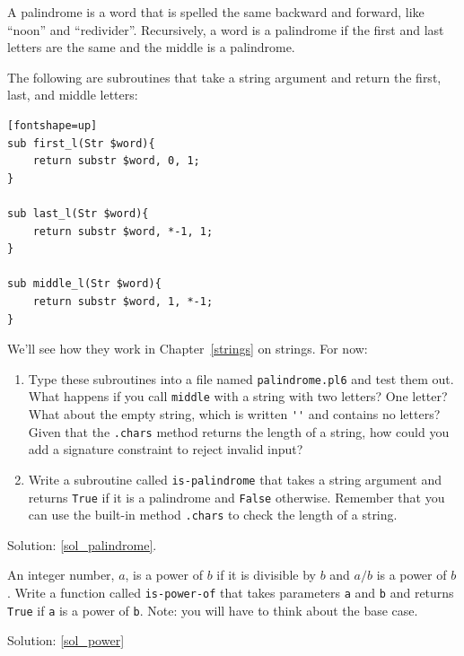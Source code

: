 \begin{exercise}
\label{palindrome}

A palindrome is a word that is spelled the same backward and
forward, like ``noon'' and ``redivider''.  Recursively, a word
is a palindrome if the first and last letters are the same
and the middle is a palindrome.

The following are subroutines that take a string argument and
return the first, last, and middle letters:

\begin{verbatim}[fontshape=up]
sub first_l(Str $word){
    return substr $word, 0, 1;
}

sub last_l(Str $word){
    return substr $word, *-1, 1;
}

sub middle_l(Str $word){
    return substr $word, 1, *-1;
}
\end{verbatim}
%
We'll see how they work in Chapter~\ref{strings} on strings. 
For now:

\begin{enumerate}

\item Type these subroutines into a file named {\tt palindrome.pl6}
and test them out.  What happens if you call {\tt middle} with
a string with two letters?  One letter?  What about the empty
string, which is written \verb"''" and contains no letters? 
Given that the {\tt .chars} method returns the length of a 
string, how could you add a signature constraint to reject invalid input?

\item Write a subroutine called \verb"is-palindrome" that takes
a string argument and returns {\tt True} if it is a palindrome
and {\tt False} otherwise.  Remember that you can use the
built-in method {\tt .chars} to check the length of a string.

\end{enumerate}

Solution: \ref{sol_palindrome}.

\end{exercise}

\begin{exercise}
\label{power}

An integer number, $a$, is a power of $b$ if it is divisible by $b$
and $a/b$ is a power of $b$.  Write a function called
\verb"is-power-of" that takes parameters {\tt a} and {\tt b}
and returns {\tt True} if {\tt a} is a power of {\tt b}.
Note: you will have to think about the base case.

Solution: \ref{sol_power}

\end{exercise}


